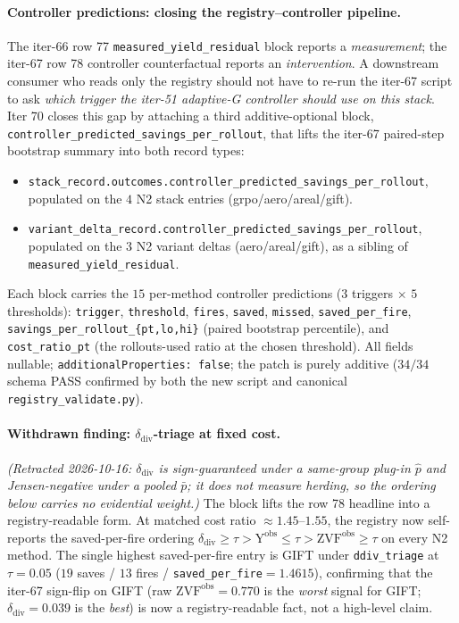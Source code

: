 \paragraph{Controller predictions: closing the registry--controller pipeline.}
The iter-66 row 77 \texttt{measured\_yield\_residual} block reports a
\emph{measurement}; the iter-67 row 78 controller counterfactual reports an
\emph{intervention}. A downstream consumer who reads only the registry should
not have to re-run the iter-67 script to ask \emph{which trigger the iter-51
adaptive-G controller should use on this stack}. Iter 70 closes this gap by
attaching a third additive-optional block,
\texttt{controller\_predicted\_savings\_per\_rollout}, that lifts the iter-67
paired-step bootstrap summary into both record types:
\begin{itemize}
  \item \texttt{stack\_record.outcomes.controller\_predicted\_savings\_per\_rollout},
        populated on the $4$ N2 stack entries (grpo/aero/areal/gift).
  \item \texttt{variant\_delta\_record.controller\_predicted\_savings\_per\_rollout},
        populated on the $3$ N2 variant deltas (aero/areal/gift), as a sibling
        of \texttt{measured\_yield\_residual}.
\end{itemize}
Each block carries the $15$ per-method controller predictions ($3$ triggers
$\times$ $5$ thresholds): \texttt{trigger}, \texttt{threshold}, \texttt{fires},
\texttt{saved}, \texttt{missed}, \texttt{saved\_per\_fire},
\texttt{savings\_per\_rollout\_\{pt,lo,hi\}} (paired bootstrap percentile),
and \texttt{cost\_ratio\_pt} (the rollouts-used ratio at the chosen
threshold). All fields nullable; \texttt{additionalProperties: false}; the
patch is purely additive ($34/34$ schema PASS confirmed by both the new
script and canonical \texttt{registry\_validate.py}).

\paragraph{Withdrawn finding: $\delta_{\mathrm{div}}$-triage at fixed cost.}
\emph{(Retracted 2026-10-16: $\delta_{\mathrm{div}}$ is sign-guaranteed under a
same-group plug-in $\hat p$ and Jensen-negative under a pooled $\bar p$; it does
not measure herding, so the ordering below carries no evidential weight.)}
The block lifts the row 78 headline into a registry-readable form. At matched
cost ratio $\approx 1.45$--$1.55$, the registry now self-reports the
saved-per-fire ordering $\delta_{\mathrm{div}}\geq\tau > \mathrm{Y^{obs}}\leq\tau
> \mathrm{ZVF^{obs}}\geq\tau$ on every N2 method. The single highest
saved-per-fire entry is GIFT under \texttt{ddiv\_triage} at $\tau=0.05$
($19$ saves / $13$ fires / \texttt{saved\_per\_fire}$=1.4615$), confirming
that the iter-67 sign-flip on GIFT (raw $\mathrm{ZVF^{obs}}=0.770$ is the
\emph{worst} signal for GIFT; $\delta_{\mathrm{div}}=0.039$ is the
\emph{best}) is now a registry-readable fact, not a high-level claim.

